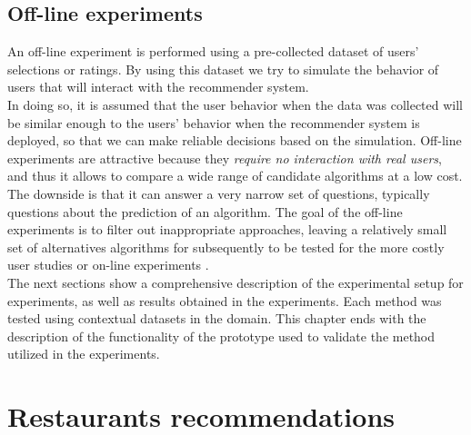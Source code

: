 \subsection{Off-line experiments} 

An off-line experiment is performed using a pre-collected dataset
of users' selections or ratings. By using this dataset we try to simulate
the behavior of users that will interact with the recommender system. \\In
doing so, it is assumed that the user behavior when the data was collected
will be similar enough to the users' behavior when the recommender
system is deployed, so that we can make reliable decisions based on
the simulation.  Off-line experiments are attractive because they
\textit{require no interaction with real users}, and thus it allows to compare
a wide range of candidate algorithms at a low cost. \\ The downside is
that it can answer a very narrow set of questions, typically questions
about the prediction of an algorithm. The goal of the off-line
experiments is to filter out inappropriate  approaches, leaving a
relatively small set of alternatives algorithms for subsequently to be
tested for the more costly user studies or on-line 
experiments  \cite{adomavicius2011context}.\\
The next sections show a comprehensive description of the 
experimental setup for experiments, as well as results obtained 
in the experiments. Each method was tested using contextual 
datasets in the domain.  This chapter ends with the  
description of the functionality of the prototype used to 
validate the method utilized in the experiments.

\section{Restaurants recommendations} \label{restaurants}


